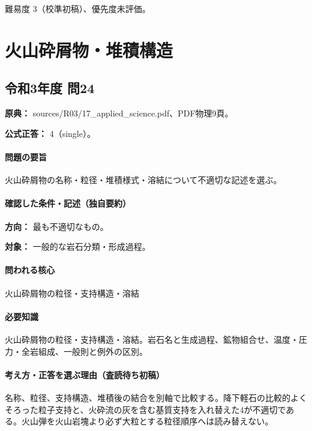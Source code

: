 \par 難易度 3（校準初稿）、優先度未評価。

\section{火山砕屑物・堆積構造}

\subsection{令和3年度 問24}
\label{q:r03-reg-applied-24}

\noindent\textbf{原典：} sources/R03/17\_applied\_science.pdf、PDF物理9頁。

\textbf{公式正答：} 4（single）。

\paragraph{問題の要旨} 火山砕屑物の名称・粒径・堆積様式・溶結について不適切な記述を選ぶ。

\paragraph{確認した条件・記述（独自要約）}\mbox{}\par

\noindent\textbf{方向：} 最も不適切なもの。\par

\noindent\textbf{対象：} 一般的な岩石分類・形成過程。\par

\paragraph{問われる核心} 火山砕屑物の粒径・支持構造・溶結

\paragraph{必要知識} 火山砕屑物の粒径・支持構造・溶結。岩石名と生成過程、鉱物組合せ、温度・圧力・全岩組成、一般則と例外の区別。

\paragraph{考え方・正答を選ぶ理由（査読待ち初稿）} 名称、粒径、支持構造、堆積後の結合を別軸で比較する。降下軽石の比較的よくそろった粒子支持と、火砕流の灰を含む基質支持を入れ替えた4が不適切である。火山弾を火山岩塊より必ず大粒とする粒径順序へは読み替えない。

